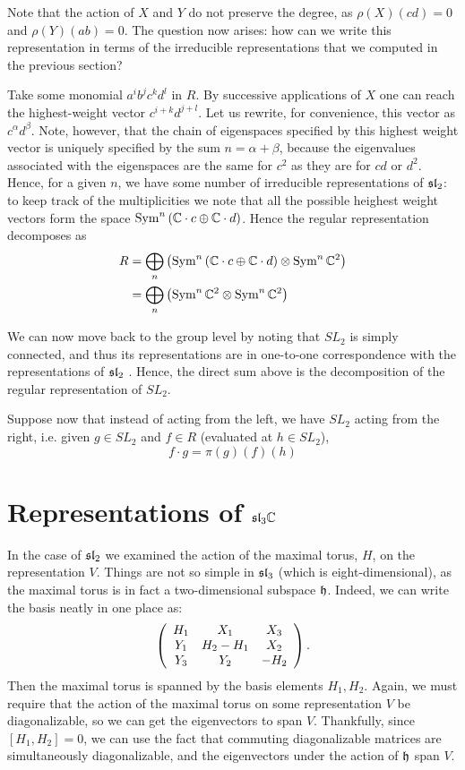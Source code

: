 \documentclass{../mathnotes}
\begin{document}
Note that the action of $X$ and $Y$ do not preserve the degree, as $\rho(X)(cd)=0$ and $\rho(Y)(ab)=0$.
The question now arises: how can we write this representation in terms of the irreducible representations that we
computed in the previous section?

Take some monomial $a^ib^jc^kd^l$ in $R$. By successive applications of $X$ one can reach the highest-weight vector
$c^{i+k}d^{j+l}$. Let us rewrite, for convenience, this vector as $c^{\alpha}d^{\beta}$. Note, however, that the chain of eigenspaces
specified by this highest weight vector is uniquely specified by the sum $n=\alpha+\beta$, because the eigenvalues associated with the
eigenspaces are the same for $c^2$ as they are for $cd$ or $d^2$. Hence, for a given $n$, we have some number of irreducible representations of $\mathfrak{sl}_2$:
to keep track of the multiplicities we note that all the possible heighest weight vectors form the space $\operatorname{Sym}^n\left( \mathbb{C}\cdot c\oplus\mathbb{C}\cdot d\right)$. Hence
the regular representation decomposes as
\begin{align*}
    R&=\bigoplus_n\left( \operatorname{Sym}^n\left( \mathbb{C}\cdot c\oplus\mathbb{C}\cdot d\right)\otimes\operatorname{Sym}^n\mathbb{C}^2\right)\\
    &=\bigoplus_n\left(\operatorname{Sym}^n\mathbb{C}^2 \otimes\operatorname{Sym}^n\mathbb{C}^2\right)
\end{align*}

We can now move back to the group level by noting that $SL_2$ is simply connected, and thus its representations are
in one-to-one correspondence with the representations of $\mathfrak{sl}_2$ \cite{F-H}. Hence, the direct sum above is the decomposition of
the regular representation of $SL_2$.

Suppose now that instead of acting from the left, we have $SL_2$ acting from the right, i.e. given $g\in SL_2$ and $f\in R$
(evaluated at $h\in SL_2$),
\[f\cdot g=\pi(g)(f)(h)\]

\section{Representations of $\mathfrak{sl}_3\mathbb{C}$}

In the case of $\mathfrak{sl}_2$ we examined the action of the maximal torus, $H$, on the representation $V$. Things
are not so simple in $\mathfrak{sl}_3$ (which is eight-dimensional), as the maximal torus is in fact a two-dimensional
subspace $\mathfrak h$. Indeed, we can write the basis neatly in one place as:
\begin{equation*}
    \left( 
    \begin{array}[]{ccc}
        H_1 & X_1 & X_3\\
        Y_1 & H_2-H_1 & X_2\\
        Y_3 & Y_2 & -H_2
    \end{array}
    \right).
\end{equation*}
Then the maximal torus is spanned by the basis elements ${H_1,H_2}$. Again, we must require that the action
of the maximal torus on some representation $V$ be diagonalizable, so we can get the eigenvectors to span $V$.
Thankfully, since $[H_1,H_2]=0$, we can use the fact that commuting diagonalizable matrices are simultaneously
diagonalizable, and the eigenvectors under the action of $\mathfrak h$ span $V$.
\end{document}
